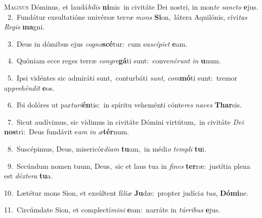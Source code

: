 \lettrine{\initial\textcolor{\initialcolor}{M}}{agnus} Dóminus, et laudá\-\textit{bi}\-\textit{lis} \textbf{ni}\-mis~\star in civitáte Dei nostri, in mon\textit{te} \textit{sanc}\-\textit{to} \textbf{e}\-jus.\\
{\numbfont\textcolor{\numbcolor}{~2.}}~Fundátur exsultatióne univérsæ ter\textit{ræ} \textit{mons} \textbf{Si}\-on,~\star látera Aquilónis, cívi\textit{tas} \textit{Re}\-\textit{gis} \textbf{ma}\-gni.\par
{\numbfont\textcolor{\numbcolor}{~3.}}~Deus in dómibus ejus \textit{co}\-\textit{gno}\textbf{scé}tur:~\star cum su\-\textit{scí}\-\textit{pi}\textit{et} \textbf{e}\-am.\par
{\numbfont\textcolor{\numbcolor}{~4.}}~Quóniam ecce reges terræ \textit{con}\-\textit{gre}\textbf{gá}ti sunt:~\star conve\-\textit{né}\-\textit{runt} \textit{in} \textbf{u}\-num.\par
{\numbfont\textcolor{\numbcolor}{~5.}}~Ipsi vidéntes sic admiráti sunt,~\dagger conturbáti \textit{sunt}\-, \textit{com}\-\textbf{mó}ti sunt:~\star tremor ap\-\textit{pre}\-\textit{hén}\textit{dit} \textbf{e}\-os.\par
{\numbfont\textcolor{\numbcolor}{~6.}}~Ibi dolóres ut par\-\textit{tu}\-\textit{ri}\textbf{én}tis:~\star in spíritu veheménti cónte\textit{res} \textit{na}\-\textit{ves} \textbf{Thar}\-sis.\par
{\numbfont\textcolor{\numbcolor}{~7.}}~Sicut audívimus, sic vídimus in civitáte Dómini virtútum,~\dagger in civitáte \textit{De}\-\textit{i} \textbf{nos}\-tri:~\star Deus fundávit e\textit{am} \textit{in} \textit{æ}\-\textbf{tér}num.\par
{\numbfont\textcolor{\numbcolor}{~8.}}~Suscépimus, Deus, misericór\-\textit{di}\-\textit{am} \textbf{tu}\-am,~\star in médi\textit{o} \textit{tem}\-\textit{pli} \textbf{tu}\-i.\par
{\numbfont\textcolor{\numbcolor}{~9.}}~Secúndum nomen tuum, Deus,~\dagger sic et laus tua in \textit{fi}\-\textit{nes} \textbf{ter}\-ræ:~\star justítia plena est \textit{déx}\-\textit{te}\textit{ra} \textbf{tu}\-a.\par
{\numbfont\textcolor{\numbcolor}{10.}}~Lætétur mons Sion, et exsúltent fí\-\textit{li}\-\textit{æ} \textbf{Ju}\-dæ:~\star propter judíci\textit{a} \textit{tu}\-\textit{a}, \textbf{Dó}\-\textbf{mi}ne.\par
{\numbfont\textcolor{\numbcolor}{11.}}~Circúmdate Sion, et complectí\-\textit{mi}\-\textit{ni} \textbf{e}\-am:~\star narráte in \textit{túr}\-\textit{ri}\textit{bus} \textbf{e}\-jus.\par
